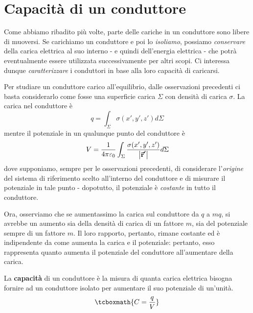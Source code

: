 \section{Capacità di un conduttore}
Come abbiamo ribadito più volte, parte delle cariche in un conduttore sono libere di muoversi. Se carichiamo un conduttore e poi lo \textit{isoliamo}, possiamo \textit{conservare} della carica elettrica al suo interno - e quindi dell'energia elettrica - che potrà eventualmente essere utilizzata successivamente per altri scopi. %
Ci interessa dunque \textit{caratterizzare} i conduttori in base alla loro capacità di caricarsi.
\begin{observe}
	Per studiare un conduttore carico all'equilibrio, dalle osservazioni precedenti ci basta considerarlo come fosse una superficie carica $\Sigma$ con densità di carica $\sigma$. La carica nel conduttore è
	\begin{equation*}
		q=\int_{\Sigma}\sigma\left(x',y',z'\right)d\Sigma
	\end{equation*}
	mentre il potenziale in un qualunque punto del conduttore è
	\begin{equation*}
		V=\frac{1}{4\pi\varepsilon_0}\int_{\Sigma}\frac{\sigma(x',y',z')}{\abs{\vb*{\va{r}}'}}d\Sigma
	\end{equation*}
	dove supponiamo, sempre per le osservazioni precedenti, di considerare l'\textit{origine} del sistema di riferimento scelto all'interno del conduttore e di misurare il potenziale in tale punto - dopotutto, il potenziale è \textit{costante} in tutto il conduttore.
\end{observe}%
Ora, osserviamo che se aumentassimo la carica sul conduttore da $q$ a $mq$, si avrebbe un aumento sia della densità di carica di un fattore $m$, sia del potenziale sempre di un fattore $m$. Il loro rapporto, pertanto, rimane costante ed è indipendente da come aumenta la carica e il potenziale: pertanto, esso rappresenta quanto aumenta il potenziale del conduttore all'aumentare della carica. 
\begin{define}
	La \textbf{capacità} di un conduttore è la misura di quanta carica elettrica bisogna fornire ad un conduttore isolato per aumentare il suo potenziale di un'unità.
	\begin{equation}
		\tcboxmath{C=\frac{q}{V}}
	\end{equation}
\end{define}
